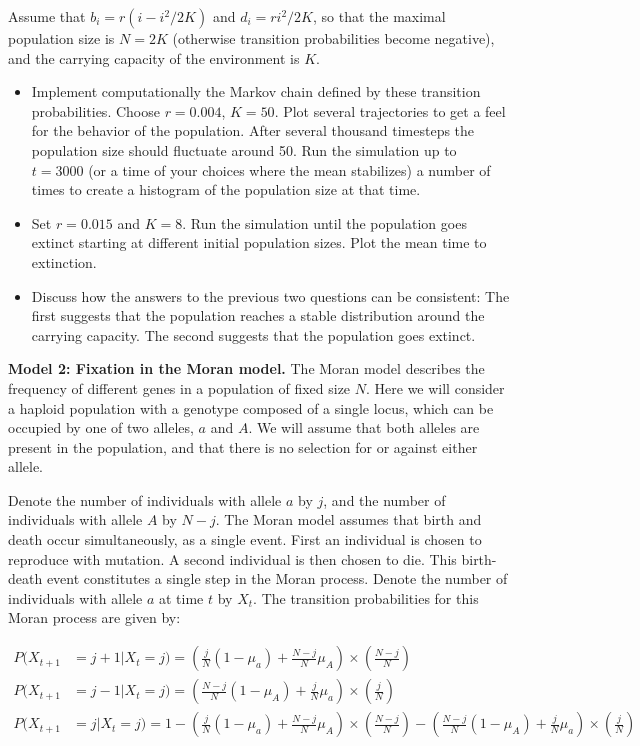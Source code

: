 \documentclass[12pt]{article}
\begin{document}
Assume that $b_i = r(i - i^2/2K)$ and $d_i = r i^2/2K$, so that the maximal population size is $N = 2K$ (otherwise transition probabilities become negative), 
and the carrying capacity of the environment is $K$.
\begin{itemize}
\item Implement computationally the Markov chain defined by these transition probabilities.  Choose $r = 0.004$, $K = 50$.  Plot several trajectories to get
a feel for the behavior of the population.  After several thousand timesteps the population size should fluctuate around 50.  Run the simulation 
up to $t = 3000$ (or a time of your choices where the mean stabilizes) a number of times to create a histogram of the population size at that time. 
\item Set $r = 0.015$ and $K = 8$.  Run the simulation until the population goes extinct starting at different initial population sizes.  Plot the mean 
time to extinction.
\item Discuss how the answers to the previous two questions can be consistent: The first suggests that the population reaches a stable distribution
around the carrying capacity.  The second suggests that the population goes extinct.
\end{itemize}


\noindent \textbf{Model 2: Fixation in the Moran model.}  The Moran model describes the frequency of different genes in a population of fixed size $N$.
Here we will consider a haploid population with a genotype composed of a single locus, which can be occupied by one of two alleles, $a$ and $A$. We will assume that both alleles are present in the population, and that there is no selection for or against either allele.

Denote the number of individuals with allele $a$ by $j$, and the number of individuals with allele $A$ by $N-j$. The Moran model assumes that birth and death occur simultaneously, as a single event. First an individual is chosen to reproduce with mutation. A second individual is then chosen to die. This birth-death event constitutes a single step in the Moran process. Denote the
number of individuals with allele $a$ at time $t$ by $X_t$. The transition probabilities for this Moran process are given by:

\begin{align*}
P(X_{t+1} &= j+1 | X_{t} = j) = \left(\frac{j}{N}(1-\mu_a)+\frac{N-j}{N}\mu_A\right)\times\left(\frac{N-j}{N}\right) \\
P(X_{t+1} &= j-1 | X_{t} = j) =  \left(\frac{N-j}{N}(1-\mu_A)+\frac{j}{N}\mu_a\right)\times\left(\frac{j}{N}\right) \\
P(X_{t+1} &= j | X_{t} = j) = 1 -  \left(\frac{j}{N}(1-\mu_a)+\frac{N-j}{N}\mu_A\right)\times\left(\frac{N-j}{N}\right)- \left(\frac{N-j}{N}(1-\mu_A)+\frac{j}{N}\mu_a\right)\times\left(\frac{j}{N}\right)
\end{align*}
\end{document}
